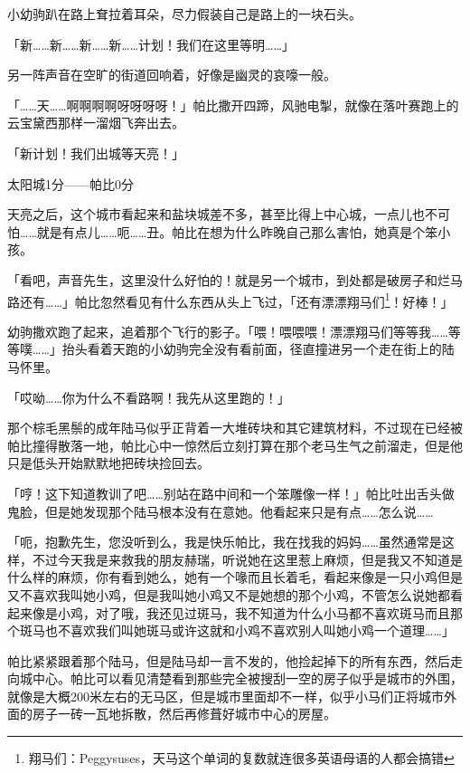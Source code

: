 小幼驹趴在路上耷拉着耳朵，尽力假装自己是路上的一块石头。

「新……新……新……新……计划！我们在这里等明……」

另一阵声音在空旷的街道回响着，好像是幽灵的哀嚎一般。

「……天……啊啊啊啊呀呀呀呀！」帕比撒开四蹄，风驰电掣，就像在落叶赛跑上的云宝黛西那样一溜烟飞奔出去。

「新计划！我们出城等天亮！」

\begin{center}
太阳城1分——帕比0分
\end{center}

\horizonline


天亮之后，这个城市看起来和盐块城差不多，甚至比得上中心城，一点儿也不可怕……就是有点儿……呃……丑。帕比在想为什么昨晚自己那么害怕，她真是个笨小孩。

「看吧，声音先生，这里没什么好怕的！就是另一个城市，到处都是破房子和烂马路还有……」帕比忽然看见有什么东西从头上飞过，「还有漂漂翔马们\footnote{翔马们：Peggysuses，天马这个单词的复数就连很多英语母语的人都会搞错}！好棒！」

幼驹撒欢跑了起来，追着那个飞行的影子。「喂！喂喂喂！漂漂翔马们等等我……等等噗……」抬头看着天跑的小幼驹完全没有看前面，径直撞进另一个走在街上的陆马怀里。

「哎呦……你为什么不看路啊！我先从这里跑的！」

那个棕毛黑鬃的成年陆马似乎正背着一大堆砖块和其它建筑材料，不过现在已经被帕比撞得散落一地，帕比心中一惊然后立刻打算在那个老马生气之前溜走，但是他只是低头开始默默地把砖块捡回去。

「哼！这下知道教训了吧……别站在路中间和一个笨雕像一样！」帕比吐出舌头做鬼脸，但是她发现那个陆马根本没有在意她。他看起来只是有点……怎么说……

「呃，抱歉先生，您没听到么，我是快乐帕比，我在找我的妈妈……虽然通常是这样，不过今天我是来救我的朋友赫瑞，听说她在这里惹上麻烦，但是我又不知道是什么样的麻烦，你有看到她么，她有一个喙而且长着毛，看起来像是一只小鸡但是又不喜欢我叫她小鸡，但是我叫她小鸡又不是她想的那个小鸡，不管怎么说她都看起来像是小鸡，对了哦，我还见过斑马，我不知道为什么小马都不喜欢斑马而且那个斑马也不喜欢我们叫她斑马或许这就和小鸡不喜欢别人叫她小鸡一个道理……」

帕比紧紧跟着那个陆马，但是陆马却一言不发的，他捡起掉下的所有东西，然后走向城中心。帕比可以看见清楚看到那些完全被搜刮一空的房子似乎是城市的外围，就像是大概200米左右的无马区，但是城市里面却不一样，似乎小马们正将城市外面的房子一砖一瓦地拆散，然后再修葺好城市中心的房屋。

